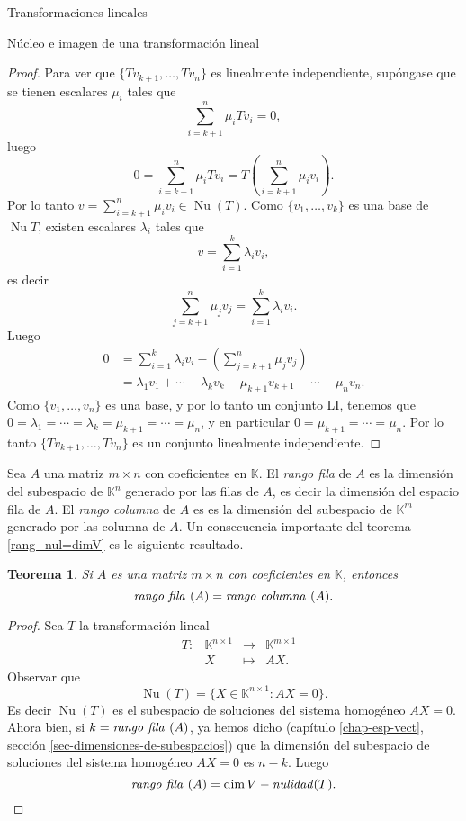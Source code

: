 \documentclass[a4paper,12pt,twoside,spanish]{amsbook}
\newtheorem{teorema}{Teorema}[section]
\theoremstyle{definition}
\theoremstyle{remark}
\newcommand{\nuc}{\operatorname{Nu}}
\newcommand{\K}{\mathbb K}
\begin{document}
\begin{chapter}{Transformaciones lineales}
\begin{section}{Núcleo e imagen de una transformación lineal}
\begin{proof}
		 	Para ver que  $\{Tv_{k+1},\ldots,Tv_n \}$ es linealmente independiente, supóngase que se tienen escalares $\mu_i$ tales que
		 	$$
		 	\sum_{i=k+1}^n \mu_i Tv_i = 0,
		 	$$
		 	luego
		 	$$
		 	0 = \sum_{i=k+1}^n \mu_i Tv_i =   T(\sum_{i=k+1}^n\mu_iv_i).  
		 	$$
		 	Por lo tanto $v =\sum_{i=k+1}^n \mu_iv_i\in \nuc(T)$. Como  $\{v_1,\ldots,v_k \}$ es una base de $\nuc T$,  existen escalares $\lambda_i$ tales que
		 	$$
		 	v =  \sum_{i=1}^k \lambda_i v_i,
		 	$$
		 	es decir
		 	$$
		 	\sum_{j=k+1}^n \mu_jv_j =  \sum_{i=1}^k \lambda_i v_i.
		 	$$
		 	Luego
		 	\begin{align*}
		 			0 &= \sum_{i=1}^k \lambda_i v_i - (\sum_{j=k+1}^n \mu_jv_j) \\
		 			&= \lambda_1 v_1 + \cdots +\lambda_k v_k - \mu_{k+1}v_{k+1} -\cdots-\mu_nv_n.
		 	\end{align*}
		 	Como $\{v_1,\ldots,v_n \}$ es una base, y por lo tanto un conjunto LI,  tenemos que  $0=\lambda_1=\cdots=\lambda_k=\mu_{k+1}=\cdots=\mu_n$, y  en particular $0=\mu_{k+1}=\cdots=\mu_n$. Por lo tanto $\{Tv_{k+1},\ldots,Tv_n \}$ es un conjunto linealmente independiente.		  
		\end{proof}
		
	
		
		Sea $A$ una matriz $m \times n$ con coeficientes  en $\K$. El  \textit{rango fila} de $A$ es la dimensión del subespacio de $\K^n$ generado por las filas de $A$, es decir la dimensión del espacio fila de $A$. El \textit{rango columna} de $A$  es es la dimensión del subespacio de $\K^m$ generado por las columna de $A$. Un  consecuencia importante del teorema \ref{rang+nul=dimV} es le siguiente resultado. 
		
		\begin{teorema}
			Si $A$ es una matriz $m \times n$ con coeficientes  en $\K$, entonces
			$$
			\text{\textit{rango fila }} (A) = \text{\textit{rango  columna }} (A).
			$$
		\end{teorema}
		\begin{proof}
			Sea $T$ la transformación lineal
			\begin{equation*}
				\begin{array}{lllll}
				&T: &\K^{n \times 1} &\to &\K^{m \times 1} \\
				&&X &\mapsto &AX.
				\end{array}
			\end{equation*}
			Observar que
			$$
			\nuc(T) = \{X \in \K^{n \times 1}: AX=0 \}.
			$$
			Es decir $\nuc(T)$  es el subespacio de soluciones del sistema homogéneo $AX=0$. Ahora bien, si $k = \text{\textit{rango fila }} (A)$, ya hemos dicho (capítulo \ref{chap-esp-vect}, sección \ref{sec-dimensiones-de-subespacios}) que la dimensión del subespacio de soluciones del sistema homogéneo $AX=0$ es $n-k$. Luego
			\begin{equation}\label{rangofila=n-nulT}
				\text{\textit{rango fila }} (A) = \dim V - \text{\textit{nulidad}}(T). 
			\end{equation}
			

\end{proof}
\end{section}
\end{chapter}
\end{document}
